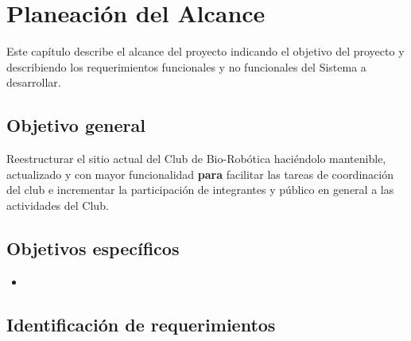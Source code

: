 \chapter{Planeación del Alcance}	
\label{cap:alcance}

	Este capítulo describe el alcance del proyecto indicando el objetivo del proyecto y describiendo los requerimientos funcionales y no funcionales del Sistema a desarrollar.

\section{Objetivo general}	

	Reestructurar el sitio actual del Club de Bio-Robótica haciéndolo mantenible,  actualizado y con mayor funcionalidad {\bf para} facilitar las tareas de coordinación del club e incrementar la participación de integrantes y público en general a las actividades del Club.

\section{Objetivos específicos}	

\begin{itemize}
	\item 
\end{itemize}


\section{Identificación de requerimientos}	


%	

